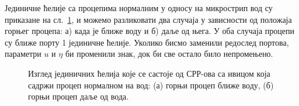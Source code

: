 \documentclass[main.tex]{subfiles}
\begin{document}
Јединичне ћелије са процепима нормалним у односу на микрострип вод су приказане на сл.~\ref{norm_gep}, и можемо разликовати два случаја у зависности од положаја горњег процепа: а) када је ближе воду и б) даље од њега. У оба случаја процепи су ближе порту 1 јединичне ћелије. Уколико бисмо заменили редослед портова, параметри $u$ и $\eta$ би променили знак, док би све остало било непромењено.
\begin{figure}[!t]
\hfill
{}
\caption{Изглед јединичних ћелија које се састоје од СРР-ова са ивицом која садржи процеп нормалном на вод: (а) горњи процеп ближе воду, (б) горњи процеп даље од вода.}
\label{norm_gep}
\end{figure}
\end{document}
